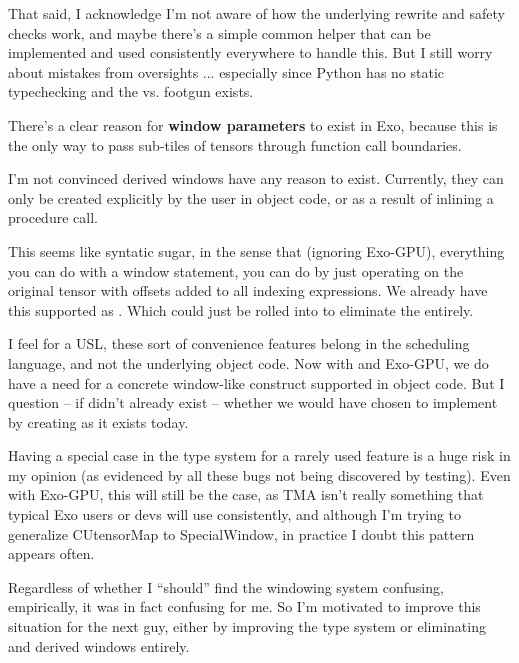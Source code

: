 \filbreak
That said, I acknowledge I'm not aware of how the underlying rewrite and safety checks work, and maybe there's a simple common helper that can be implemented and used consistently everywhere to handle this.
But I still worry about mistakes from oversights ... especially since Python has no static typechecking and the  vs.  footgun exists.

\filbreak
{} There's a clear reason for \textbf{window parameters} to exist in Exo, because this is the only way to pass sub-tiles of tensors through function call boundaries.

\filbreak
I'm not convinced derived windows have any reason to exist.
Currently, they can only be created explicitly by the user in object code, or as a result of inlining a procedure call.

\filbreak
This seems like syntatic sugar, in the sense that (ignoring Exo-GPU), everything you can do with a window statement, you can do by just operating on the original tensor with offsets added to all indexing expressions.
We already have this supported as .
Which could just be rolled into  to eliminate the  entirely.

I feel for a USL, these sort of convenience features belong in the scheduling language, and not the underlying object code.
Now with  and Exo-GPU, we do have a need for a concrete window-like construct supported in object code.
But I question -- if  didn't already exist -- whether we would have chosen to implement  by creating  as it exists today.

\filbreak
{}

Having a special case in the type system for a rarely used feature is a huge risk in my opinion (as evidenced by all these bugs not being discovered by testing).
Even with Exo-GPU, this will still be the case, as TMA isn't really something that typical Exo users or devs will use consistently, and although I'm trying to generalize CUtensorMap to SpecialWindow, in practice I doubt this pattern appears often.

Regardless of whether I ``should'' find the windowing system confusing, empirically, it was in fact confusing for me.
So I'm motivated to improve this situation for the next guy, either by improving the type system or eliminating  and derived windows entirely.


